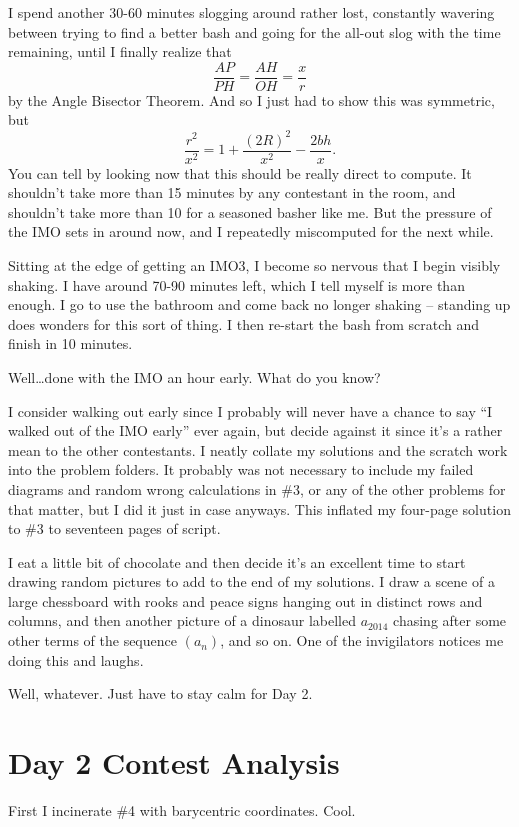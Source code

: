 \documentclass[11pt]{scrreprt}
\numberwithin{figure}{chapter}
\begin{document}
I spend another 30-60 minutes slogging around rather lost,
constantly wavering between trying to find a better bash and going for the
all-out slog with the time remaining,  until I finally realize that
\[ \frac{AP}{PH} = \frac{AH}{OH} = \frac{x}{r} \]
by the Angle Bisector Theorem. And so I just had to show this was symmetric, but
\[ \frac{r^2}{x^2} = 1 + \frac{(2R)^2}{x^2} - \frac{2bh}{x}. \]
You can tell by looking now that this should be really direct to compute.
It shouldn't take more than 15 minutes by any contestant in the room,
and shouldn't take more than 10 for a seasoned basher like me.
But the pressure of the IMO sets in around now, and I repeatedly miscomputed for the next while.

Sitting at the edge of getting an IMO3, I become so nervous that I begin visibly shaking.
I have around 70-90 minutes left, which I tell myself is more than enough.
I go to use the bathroom and come back no longer shaking -- standing up does wonders for this sort of thing.
I then re-start the bash from scratch and finish in 10 minutes.

Well\dots done with the IMO an hour early. What do you know?

I consider walking out early since I probably will never have a chance to say
``I walked out of the IMO early'' ever again,
but decide against it since it's a rather mean to the other contestants.
I neatly collate my solutions and the scratch work into the problem folders.
It probably was not necessary to include my failed diagrams and random wrong calculations in \#3,
or any of the other problems for that matter, but I did it just in case anyways.
This inflated my four-page solution to \#3 to seventeen pages of script.

I eat a little bit of chocolate and then decide it's an excellent time to start
drawing random pictures to add to the end of my solutions.
I draw a scene of a large chessboard with rooks and peace signs hanging out in distinct rows and columns,
and then another picture of a dinosaur labelled $a_{2014}$ chasing after some
other terms of the sequence $(a_n)$, and so on.
One of the invigilators notices me doing this and laughs.

Well, whatever. Just have to stay calm for Day 2.

\section{Day 2 Contest Analysis}
First I incinerate \#4 with barycentric coordinates.  Cool.
\end{document}
